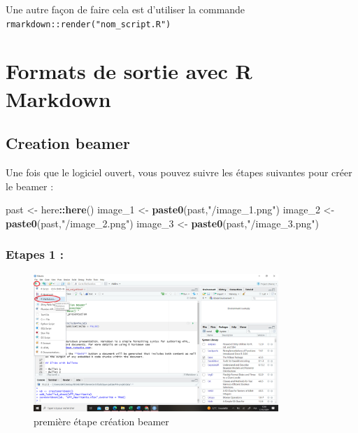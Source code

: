 \documentclass[
  12pt,
]{article}
\newenvironment{Shaded}{\begin{snugshade}}{\end{snugshade}}
\newcommand{\FunctionTok}[1]{\textcolor[rgb]{0.13,0.29,0.53}{\textbf{#1}}}
\newcommand{\NormalTok}[1]{#1}
\newcommand{\OtherTok}[1]{\textcolor[rgb]{0.56,0.35,0.01}{#1}}
\newcommand{\SpecialCharTok}[1]{\textcolor[rgb]{0.81,0.36,0.00}{\textbf{#1}}}
\newcommand{\StringTok}[1]{\textcolor[rgb]{0.31,0.60,0.02}{#1}}
\begin{document}
Une autre façon de faire cela est d'utiliser la commande
\texttt{rmarkdown::render("nom\_script.R")}

\newpage

\section{Formats de sortie avec R
Markdown}\label{formats-de-sortie-avec-r-markdown}

\subsection{Creation beamer}\label{creation-beamer}

Une fois que le logiciel ouvert, vous pouvez suivre les étapes suivantes
pour créer le beamer :

\begin{Shaded}
\begin{Highlighting}[]
\NormalTok{past }\OtherTok{\textless{}{-}}\NormalTok{ here}\SpecialCharTok{::}\FunctionTok{here}\NormalTok{()}
\NormalTok{image\_1 }\OtherTok{\textless{}{-}} \FunctionTok{paste0}\NormalTok{(past,}\StringTok{"/image\_1.png"}\NormalTok{)}
\NormalTok{image\_2 }\OtherTok{\textless{}{-}} \FunctionTok{paste0}\NormalTok{(past,}\StringTok{"/image\_2.png"}\NormalTok{)}
\NormalTok{image\_3 }\OtherTok{\textless{}{-}} \FunctionTok{paste0}\NormalTok{(past,}\StringTok{"/image\_3.png"}\NormalTok{)}
\end{Highlighting}
\end{Shaded}

\subsubsection{Etapes 1 :}\label{etapes-1}

\begin{figure}
\centering
\includegraphics[width=3.64583in,height=\textheight]{image_1}
\caption{première étape création beamer}
\end{figure}
\end{document}
